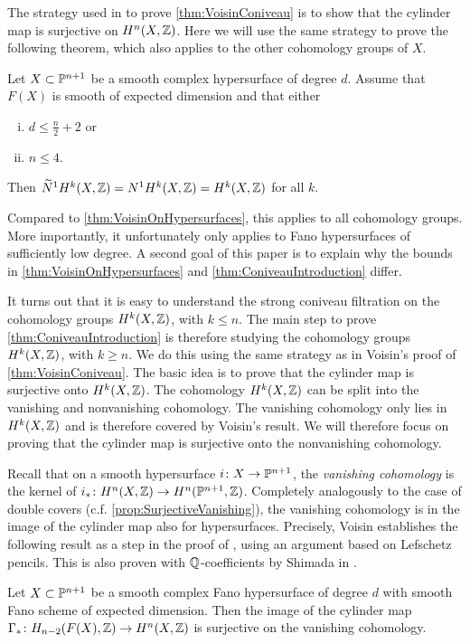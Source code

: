 The strategy used in \cite{VoisinConiveauThreefolds} to prove \cref{thm:VoisinConiveau} is to show that the cylinder map is surjective on $H^n(X,\Z)$. Here we will use the same strategy to prove the following theorem, which also applies to the other cohomology groups of $X$.
\begin{theorem}
\label{thm:ConiveauIntroduction}
  Let $X \subset \P^{n+1}$ be a smooth complex hypersurface of degree $d$. Assume that $F(X)$ is smooth of expected dimension and that either
  \begin{enumerate}[i)]
    \item$d \leq \frac{n}{2}+2$ or 
    \item $n \leq 4$.
  \end{enumerate}
Then $\widetilde{N}^1H^k(X,\Z) = N^1H^k(X,\Z) = H^k(X,\Z)$ for all $k$.
\end{theorem}
Compared to \cref{thm:VoisinOnHypersurfaces}, this applies to all cohomology groups. More importantly, it unfortunately only applies to Fano hypersurfaces of sufficiently low degree. A second goal of this paper is to explain why the bounds in \cref{thm:VoisinOnHypersurfaces} and \cref{thm:ConiveauIntroduction} differ.

It turns out that it is easy to understand the strong coniveau filtration on the cohomology groups $H^k(X,\Z)$, with $k \leq n$. The main step to prove \cref{thm:ConiveauIntroduction} is therefore studying the cohomology groups $H^k(X,\Z)$, with $k \geq n$. We do this using the same strategy as in Voisin's proof of \cref{thm:VoisinConiveau}. The basic idea is to prove that the cylinder map is surjective onto $H^k(X,\Z)$. The cohomology $H^k(X,\Z)$ can be split into the vanishing and nonvanishing cohomology. The vanishing cohomology only lies in $H^k(X,\Z)$ and is therefore covered by Voisin's result. We will therefore focus on proving that the cylinder map is surjective onto the nonvanishing cohomology.

Recall that on a smooth hypersurface $i \from X \to \P^{n+1}$, the \emph{vanishing cohomology} is the kernel of $i_* \from H^n(X,\Z) \to H^n(\P^{n+1},\Z)$. Completely analogously to the case of double covers (c.f. \cref{prop:SurjectiveVanishing}), the vanishing cohomology is in the image of the cylinder map also for hypersurfaces. Precisely, Voisin establishes the following result as a step in the proof of \cite[Theorem 1.13]{VoisinConiveauThreefolds}, using an argument based on Lefschetz pencils. This is also proven with $\Q$-coefficients by Shimada in \cite[Proposition 4]{ShimadaHypersurfaces}.
\begin{proposition}
\label{prop:SurjectiveVanishingHypersurface}
	Let $X \subset \P^{n+1}$ be a smooth complex Fano hypersurface of degree $d$ with smooth Fano scheme of expected dimension. Then the image of the cylinder map $\Gamma_* \from H_{n-2}(F(X),\Z) \to H^n(X,\Z)$ is surjective on the vanishing cohomology.
\end{proposition}

